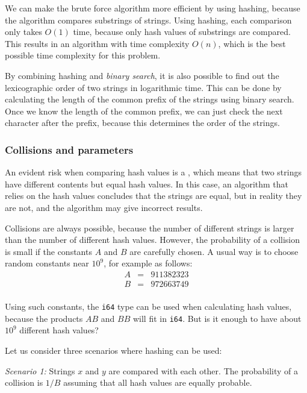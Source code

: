 We can make the brute force algorithm more efficient
by using hashing, because the algorithm compares
substrings of strings.
Using hashing, each comparison only takes $O(1)$ time,
because only hash values of substrings are compared.
This results in an algorithm with time complexity $O(n)$,
which is the best possible time complexity for this problem.

By combining hashing and \emph{binary search},
it is also possible to find out the lexicographic order of
two strings in logarithmic time.
This can be done by calculating the length
of the common prefix of the strings using binary search.
Once we know the length of the common prefix,
we can just check the next character after the prefix,
because this determines the order of the strings.

\subsubsection*{Collisions and parameters}


An evident risk when comparing hash values is
a , which means that two strings have
different contents but equal hash values.
In this case, an algorithm that relies on
the hash values concludes that the strings are equal,
but in reality they are not,
and the algorithm may give incorrect results.

Collisions are always possible,
because the number of different strings is larger
than the number of different hash values.
However, the probability of a collision is small
if the constants $A$ and $B$ are carefully chosen.
A usual way is to choose random constants
near $10^9$, for example as follows:
\[
\begin{array}{lcl}
A & = & 911382323 \\
B & = & 972663749 \\
\end{array}
\]

Using such constants,
the \texttt{i64} type can be used
when calculating hash values,
because the products $AB$ and $BB$ will fit in \texttt{i64}.
But is it enough to have about $10^9$ different hash values?

Let us consider three scenarios where hashing can be used:

\textit{Scenario 1:} Strings $x$ and $y$ are compared with
each other.
The probability of a collision is $1/B$ assuming that
all hash values are equally probable.

